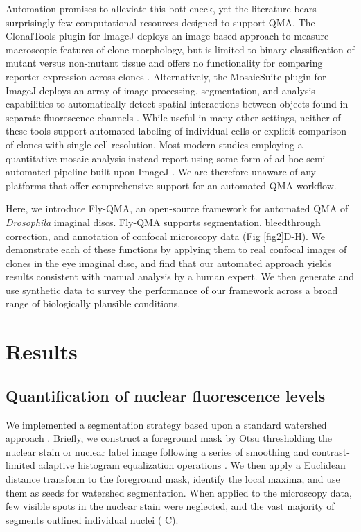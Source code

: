 \documentclass[10pt,letterpaper]{article}
\begin{document}
Automation promises to alleviate this bottleneck, yet the literature bears surprisingly few computational resources designed to support QMA. The ClonalTools plugin for ImageJ deploys an image-based approach to measure macroscopic features of clone morphology, but is limited to binary classification of mutant versus non-mutant tissue and offers no functionality for comparing reporter expression across clones \cite{Mort2009}. Alternatively, the MosaicSuite plugin for ImageJ deploys an array of image processing, segmentation, and analysis capabilities to automatically detect spatial interactions between objects found in separate fluorescence channels \cite{Helmuth2010,Shivanandan2013}. While useful in many other settings, neither of these tools support automated labeling of individual cells or explicit comparison of clones with single-cell resolution. Most modern studies employing a quantitative mosaic analysis instead report using some form of ad hoc semi-automated pipeline built upon ImageJ \cite{Dai2017,Ghiglione2018,Li2018}. We are therefore unaware of any platforms that offer comprehensive support for an automated QMA workflow.

Here, we introduce Fly-QMA, an open-source framework for automated QMA of \textit{Drosophila} imaginal discs. Fly-QMA supports segmentation, bleedthrough correction, and annotation of confocal microscopy data (Fig \ref{fig2}D-H). We demonstrate each of these functions by applying them to real confocal images of clones in the eye imaginal disc, and find that our automated approach yields results consistent with manual analysis by a human expert. We then generate and use synthetic data to survey the performance of our framework across a broad range of biologically plausible conditions.


\section*{Results}

\subsection*{Quantification of nuclear fluorescence levels}
\label{ch:segmentation}

We implemented a segmentation strategy based upon a standard watershed approach \cite{VanderWalt2014}. Briefly, we construct a foreground mask by Otsu thresholding the nuclear stain or nuclear label image following a series of smoothing and contrast-limited adaptive histogram equalization operations \cite{NobuyukiOtsu1979,VanderWalt2014}. We then apply a Euclidean distance transform to the foreground mask, identify the local maxima, and use them as seeds for watershed segmentation. When applied to the microscopy data, few visible spots in the nuclear stain were neglected, and the vast majority of segments outlined individual nuclei ( C).
\end{document}
